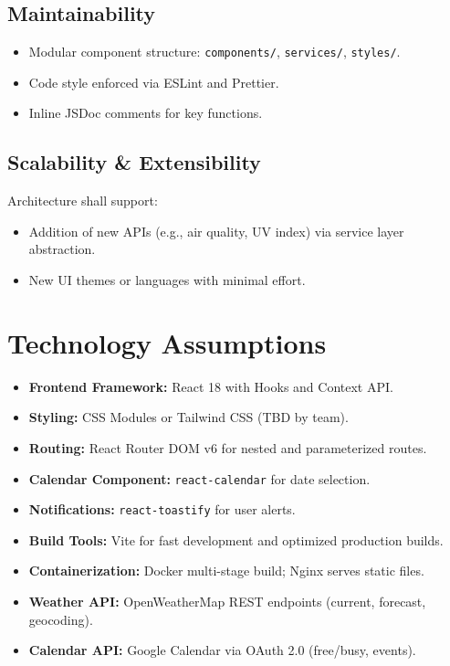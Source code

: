\documentclass[12pt,a4paper]{article}
\begin{document}
\subsection*{Maintainability}
\begin{itemize}[nosep]
  \item Modular component structure: \texttt{components/}, \texttt{services/}, \texttt{styles/}.
  \item Code style enforced via ESLint and Prettier.
  \item Inline JSDoc comments for key functions.
\end{itemize}

\subsection*{Scalability \& Extensibility}
Architecture shall support:
\begin{itemize}[nosep]
  \item Addition of new APIs (e.g., air quality, UV index) via service layer abstraction.
  \item New UI themes or languages with minimal effort.
\end{itemize}



\section{Technology Assumptions}
\begin{itemize}[nosep]
  \item \textbf{Frontend Framework:} React 18 with Hooks and Context API.
  \item \textbf{Styling:} CSS Modules or Tailwind CSS (TBD by team).
  \item \textbf{Routing:} React Router DOM v6 for nested and parameterized routes.
  \item \textbf{Calendar Component:} \texttt{react-calendar} for date selection.
  \item \textbf{Notifications:} \texttt{react-toastify} for user alerts.
  \item \textbf{Build Tools:} Vite for fast development and optimized production builds.
  \item \textbf{Containerization:} Docker multi-stage build; Nginx serves static files.
  \item \textbf{Weather API:} OpenWeatherMap REST endpoints (current, forecast, geocoding).
  \item \textbf{Calendar API:} Google Calendar via OAuth 2.0 (free/busy, events).
\end{itemize}
\end{document}
